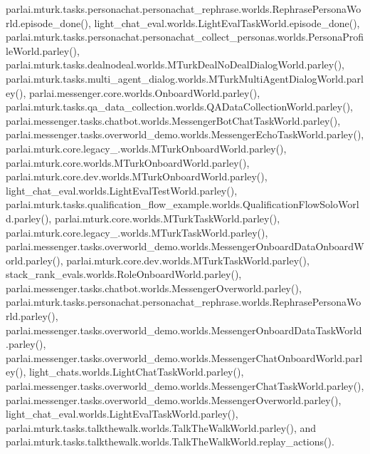 parlai.\+mturk.\+tasks.\+personachat.\+personachat\+\_\+rephrase.\+worlds.\+Rephrase\+Persona\+World.\+episode\+\_\+done(), light\+\_\+chat\+\_\+eval.\+worlds.\+Light\+Eval\+Task\+World.\+episode\+\_\+done(), parlai.\+mturk.\+tasks.\+personachat.\+personachat\+\_\+collect\+\_\+personas.\+worlds.\+Persona\+Profile\+World.\+parley(), parlai.\+mturk.\+tasks.\+dealnodeal.\+worlds.\+M\+Turk\+Deal\+No\+Deal\+Dialog\+World.\+parley(), parlai.\+mturk.\+tasks.\+multi\+\_\+agent\+\_\+dialog.\+worlds.\+M\+Turk\+Multi\+Agent\+Dialog\+World.\+parley(), parlai.\+messenger.\+core.\+worlds.\+Onboard\+World.\+parley(), parlai.\+mturk.\+tasks.\+qa\+\_\+data\+\_\+collection.\+worlds.\+Q\+A\+Data\+Collection\+World.\+parley(), parlai.\+messenger.\+tasks.\+chatbot.\+worlds.\+Messenger\+Bot\+Chat\+Task\+World.\+parley(), parlai.\+messenger.\+tasks.\+overworld\+\_\+demo.\+worlds.\+Messenger\+Echo\+Task\+World.\+parley(), parlai.\+mturk.\+core.\+legacy\+\_.\+worlds.\+M\+Turk\+Onboard\+World.\+parley(), parlai.\+mturk.\+core.\+worlds.\+M\+Turk\+Onboard\+World.\+parley(), parlai.\+mturk.\+core.\+dev.\+worlds.\+M\+Turk\+Onboard\+World.\+parley(), light\+\_\+chat\+\_\+eval.\+worlds.\+Light\+Eval\+Test\+World.\+parley(), parlai.\+mturk.\+tasks.\+qualification\+\_\+flow\+\_\+example.\+worlds.\+Qualification\+Flow\+Solo\+World.\+parley(), parlai.\+mturk.\+core.\+worlds.\+M\+Turk\+Task\+World.\+parley(), parlai.\+mturk.\+core.\+legacy\+\_.\+worlds.\+M\+Turk\+Task\+World.\+parley(), parlai.\+messenger.\+tasks.\+overworld\+\_\+demo.\+worlds.\+Messenger\+Onboard\+Data\+Onboard\+World.\+parley(), parlai.\+mturk.\+core.\+dev.\+worlds.\+M\+Turk\+Task\+World.\+parley(), stack\+\_\+rank\+\_\+evals.\+worlds.\+Role\+Onboard\+World.\+parley(), parlai.\+messenger.\+tasks.\+chatbot.\+worlds.\+Messenger\+Overworld.\+parley(), parlai.\+mturk.\+tasks.\+personachat.\+personachat\+\_\+rephrase.\+worlds.\+Rephrase\+Persona\+World.\+parley(), parlai.\+messenger.\+tasks.\+overworld\+\_\+demo.\+worlds.\+Messenger\+Onboard\+Data\+Task\+World.\+parley(), parlai.\+messenger.\+tasks.\+overworld\+\_\+demo.\+worlds.\+Messenger\+Chat\+Onboard\+World.\+parley(), light\+\_\+chats.\+worlds.\+Light\+Chat\+Task\+World.\+parley(), parlai.\+messenger.\+tasks.\+overworld\+\_\+demo.\+worlds.\+Messenger\+Chat\+Task\+World.\+parley(), parlai.\+messenger.\+tasks.\+overworld\+\_\+demo.\+worlds.\+Messenger\+Overworld.\+parley(), light\+\_\+chat\+\_\+eval.\+worlds.\+Light\+Eval\+Task\+World.\+parley(), parlai.\+mturk.\+tasks.\+talkthewalk.\+worlds.\+Talk\+The\+Walk\+World.\+parley(), and parlai.\+mturk.\+tasks.\+talkthewalk.\+worlds.\+Talk\+The\+Walk\+World.\+replay\+\_\+actions().

